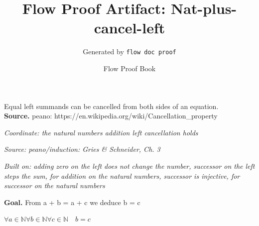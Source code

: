\documentclass[11pt]{article}
\title{Flow Proof Artifact: Nat-plus-cancel-left}
\author{Generated by \texttt{flow doc proof}}
\date{Flow Proof Book}
\theoremstyle{definition}
\begin{document}
\maketitle
Equal left summands can be cancelled from both sides of an equation.\\[0.5em]
\textbf{Source.} peano: https://en.wikipedia.org/wiki/Cancellation\_property\\[0.5em]
\bigskip
{}\par
\smallskip\noindent\textit{Coordinate: the natural numbers \cdot addition \cdot left cancellation holds}\par
\smallskip\noindent\textit{Source: peano/induction: Gries \& Schneider, Ch. 3}\par
\smallskip\noindent\textit{Built on: adding zero on the left does not change the number, successor on the left steps the sum, for addition on the natural numbers, successor is injective, for successor on the natural numbers}\par
\medskip
\noindent\textbf{Goal.} From a + b = a + c we deduce b = c\par
\noindent$\displaystyle \forall a \in \mathbb{N} \forall b \in \mathbb{N} \forall c \in \mathbb{N}\quad b = c$\par
\medskip
\noindent
\end{document}

